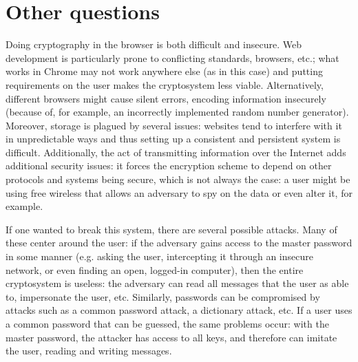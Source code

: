 \documentclass{amsart}
\begin{document}
\section{Other questions}
Doing cryptography in the browser is both difficult and insecure. Web development is particularly prone to conflicting standards, browsers, etc.; what works in Chrome may not work anywhere else (as in this case) and putting requirements on the user makes the cryptosystem less viable. Alternatively, different browsers might cause silent errors, encoding information insecurely (because of, for example, an incorrectly implemented random number generator). Moreover, storage is plagued by several issues: websites tend to interfere with it in unpredictable ways and thus setting up a consistent and persistent system is difficult. Additionally, the act of transmitting information over the Internet adds additional security issues: it forces the encryption scheme to depend on other protocols and systems being secure, which is not always the case: a user might be using free wireless that allows an adversary to spy on the data or even alter it, for example.

If one wanted to break this system, there are several possible attacks. Many of these center around the user: if the adversary gains access to the master password in some manner (e.g. asking the user, intercepting it through an insecure network, or even finding an open, logged-in computer), then the entire cryptosystem is useless: the adversary can read all messages that the user as able to, impersonate the user, etc. Similarly, passwords can be compromised by attacks such as a common password attack, a dictionary attack, etc. If a user uses a common password that can be guessed, the same problems occur: with the master password, the attacker has access to all keys, and therefore can imitate the user, reading and writing messages.
\end{document}
